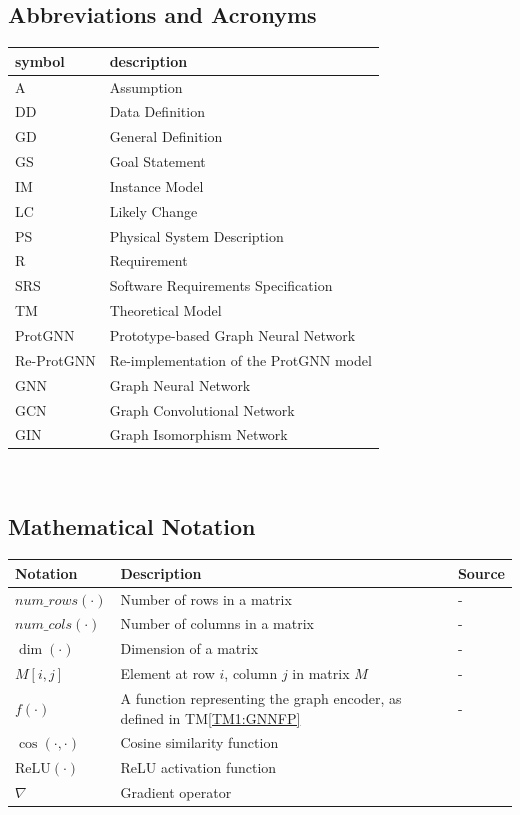 \documentclass[12pt]{article}
\newcommand{\tref}[1]{TM\ref{#1}}
\begin{document}
\subsection{Abbreviations and Acronyms}

\renewcommand{\arraystretch}{1.2}
\begin{tabular}{l l} 
  \toprule		
  \textbf{symbol} & \textbf{description}\\
  \midrule 
  A & Assumption\\
  DD & Data Definition\\
  GD & General Definition\\
  GS & Goal Statement\\
  IM & Instance Model\\
  LC & Likely Change\\
  PS & Physical System Description\\
  R & Requirement\\
  SRS & Software Requirements Specification\\
  TM & Theoretical Model\\
  ProtGNN & Prototype-based Graph Neural Network\\
  Re-ProtGNN & Re-implementation of the ProtGNN model\\
  GNN & Graph Neural Network\\
  GCN & Graph Convolutional Network\\
  GIN & Graph Isomorphism Network\\
  \bottomrule
\end{tabular}\\


\subsection{Mathematical Notation}

\renewcommand{\arraystretch}{1.2}
\noindent \begin{longtable*}{l p{7cm} l} 
\toprule
\textbf{Notation} & \textbf{Description} & \textbf{Source} \\
\midrule 
$num\_rows(\cdot)$ & Number of rows in a matrix & - \\
$num\_cols(\cdot)$ & Number of columns in a matrix & -\\
$\dim(\cdot)$ & Dimension of a matrix & - \\
$M[i, j]$ & Element at row $i$, column $j$ in matrix $M$ & - \\
$f(\cdot)$ & A function representing the graph encoder, as defined in \tref{TM1:GNNFP} & - \\
$\cos(\cdot, \cdot)$ & Cosine similarity function & ~\citep{sciencedirect_cosine_similarity} \\
$\text{ReLU}(\cdot)$ & ReLU activation function & ~\citep{wikipedia_relu} \\
$\nabla$ & Gradient operator & ~\citep{wikipedia_gradient} \\
\bottomrule
\end{longtable*}
\end{document}
